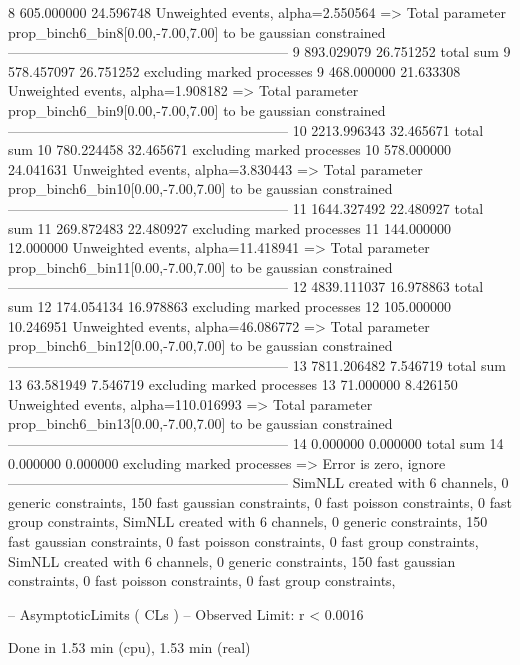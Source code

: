 8          605.000000      24.596748       Unweighted events, alpha=2.550564
  => Total parameter prop_binch6_bin8[0.00,-7.00,7.00] to be gaussian constrained
------------------------------------------------------------
9          893.029079      26.751252       total sum                     
9          578.457097      26.751252       excluding marked processes    
9          468.000000      21.633308       Unweighted events, alpha=1.908182
  => Total parameter prop_binch6_bin9[0.00,-7.00,7.00] to be gaussian constrained
------------------------------------------------------------
10         2213.996343     32.465671       total sum                     
10         780.224458      32.465671       excluding marked processes    
10         578.000000      24.041631       Unweighted events, alpha=3.830443
  => Total parameter prop_binch6_bin10[0.00,-7.00,7.00] to be gaussian constrained
------------------------------------------------------------
11         1644.327492     22.480927       total sum                     
11         269.872483      22.480927       excluding marked processes    
11         144.000000      12.000000       Unweighted events, alpha=11.418941
  => Total parameter prop_binch6_bin11[0.00,-7.00,7.00] to be gaussian constrained
------------------------------------------------------------
12         4839.111037     16.978863       total sum                     
12         174.054134      16.978863       excluding marked processes    
12         105.000000      10.246951       Unweighted events, alpha=46.086772
  => Total parameter prop_binch6_bin12[0.00,-7.00,7.00] to be gaussian constrained
------------------------------------------------------------
13         7811.206482     7.546719        total sum                     
13         63.581949       7.546719        excluding marked processes    
13         71.000000       8.426150        Unweighted events, alpha=110.016993
  => Total parameter prop_binch6_bin13[0.00,-7.00,7.00] to be gaussian constrained
------------------------------------------------------------
14         0.000000        0.000000        total sum                     
14         0.000000        0.000000        excluding marked processes    
  => Error is zero, ignore      
------------------------------------------------------------
SimNLL created with 6 channels, 0 generic constraints, 150 fast gaussian constraints, 0 fast poisson constraints, 0 fast group constraints, 
SimNLL created with 6 channels, 0 generic constraints, 150 fast gaussian constraints, 0 fast poisson constraints, 0 fast group constraints, 
SimNLL created with 6 channels, 0 generic constraints, 150 fast gaussian constraints, 0 fast poisson constraints, 0 fast group constraints, 

 -- AsymptoticLimits ( CLs ) --
Observed Limit: r < 0.0016

Done in 1.53 min (cpu), 1.53 min (real)
